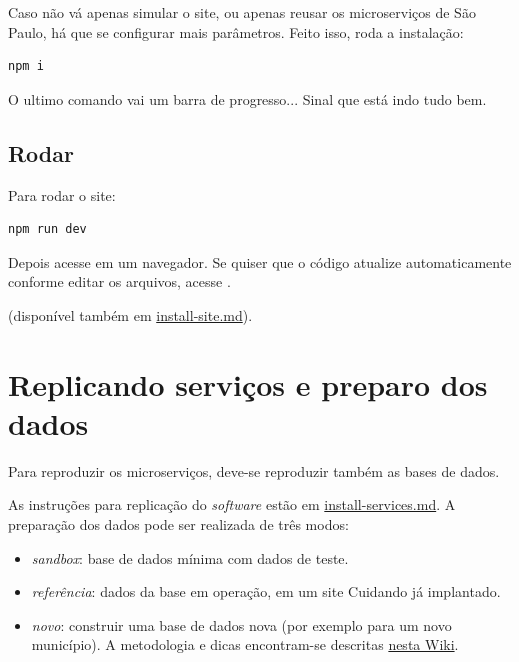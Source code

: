 \documentclass[letterpaper,10pt,brazil]{sphinxmanual}
\begin{document}
Caso não vá apenas simular o site, ou apenas reusar os microserviços de
São Paulo, há que se configurar mais parâmetros. Feito isso, roda a
instalação:

\begin{Verbatim}[commandchars=\\\{\}]
npm i
\end{Verbatim}

O ultimo comando vai um barra de progresso... Sinal que está indo tudo
bem.


\subsection{Rodar}
\label{install-site:rodar}
Para rodar o site:

\begin{Verbatim}[commandchars=\\\{\}]
npm run dev
\end{Verbatim}

Depois acesse  em um navegador. Se quiser que o código
atualize automaticamente conforme editar os arquivos, acesse
.

(disponível também em \href{https://github.com/okfn-brasil/cuidando2-doc/blob/master/install-services.md}{install-site.md}).


\section{Replicando serviços e preparo dos dados}
\label{index:replicando-servicos-e-preparo-dos-dados}
Para reproduzir os microserviços, deve-se reproduzir também as bases de
dados.

As instruções para replicação do \emph{software} estão em
\href{https://github.com/okfn-brasil/cuidando2-doc/blob/master/install-services.md}{install-services.md}. A preparação dos dados
pode ser realizada de três modos:
\begin{itemize}
\item {} 
\emph{sandbox}: base de dados mínima com dados de teste.

\item {} 
\emph{referência}: dados da base em operação, em um site Cuidando já
implantado.

\item {} 
\emph{novo}: construir uma base de dados nova (por exemplo para um novo
município). A metodologia e dicas encontram-se descritas \href{https://pt.wikiversity.org/wiki/Projeto\_Cuidando\_do\_Meu\_Bairro/Novos\_dados}{nesta
Wiki}.

\end{itemize}
\end{document}
